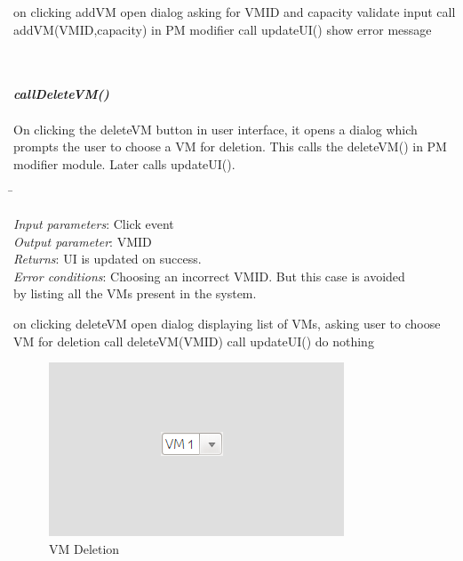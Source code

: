 \documentclass[a4paper,11pt]{article}
\begin{document}
 \begin{algorithmic}[1]
\STATE on clicking addVM
\STATE open dialog asking for VM\textunderscore ID and capacity
\STATE validate input
\STATE call addVM(VM\textunderscore ID,capacity) in PM modifier
\STATE call updateUI()
\ELSE 
\STATE show error message
\ENDIF
 \end{algorithmic}
\mbox{}\\\\
 \emph{\bf callDeleteVM()}\\\\
 On clicking the deleteVM button in user interface, it opens a dialog  which prompts the user to choose a VM for deletion.
 This calls the deleteVM() in PM modifier module. Later calls updateUI().
 \\  \begin{tabbing}
   \hspace*{4cm}\= \kill
 
 \emph{Input parameters}\>: Click event\\
 \emph{Output parameter}\>: VM\textunderscore ID\\
\emph{Returns}\>: UI is updated on success.\\
\emph{Error conditions}\>: Choosing an incorrect VM\textunderscore ID. But this case is avoided \\ \> by listing all the VMs present in the system.
\end{tabbing}
\begin{algorithmic}[1]
 \STATE on clicking deleteVM
 \STATE open dialog displaying list of VMs, asking user to choose VM for deletion
 \STATE call deleteVM(VM\textunderscore ID)
 \STATE call updateUI()
 \ELSE
 \STATE do nothing
 \ENDIF
 \end{algorithmic}
\begin{figure}[ht!]
\centering
\includegraphics[scale=0.8, angle=0]{images/4.png}
\caption{VM Deletion}
\end{figure}
\mbox{}\\\\
\end{document}
